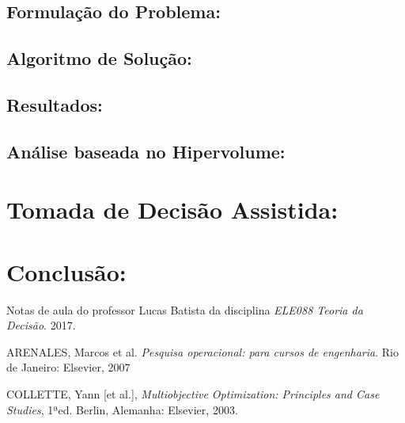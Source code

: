 \documentclass[conference]{IEEEtran}
\begin{document}
\subsection{Formulação do Problema:}


\subsection{Algoritmo de Solução:}


\subsection{Resultados:}


\subsection{Análise baseada no Hipervolume:}


\section{Tomada de Decisão Assistida:}


\section{Conclusão:}


\begin{thebibliography}{1}

Notas de aula do professor Lucas Batista da disciplina \emph{ELE088 Teoria da Decisão}. 2017.

ARENALES, Marcos et al. \emph{Pesquisa operacional: para cursos de engenharia}. Rio de Janeiro: Elsevier, 2007

COLLETTE, Yann [et al.], \emph{Multiobjective Optimization: Principles and Case Studies}, 1ªed. Berlin, Alemanha: Elsevier, 2003.
\end{thebibliography}


\end{document}
